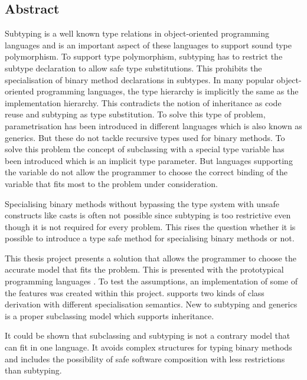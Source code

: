 %
%
\subsection*{Abstract}
Subtyping is a well known type relations in object-oriented
programming languages and is an important aspect of these languages
to support sound type polymorphism. To support type polymorphism,
subtyping has to restrict the subtype declaration to allow safe type
substitutions. This prohibits the specialisation of binary method declarations 
in subtypes. In many popular object-oriented programming languages, the type
hierarchy is implicitly the same as the implementation hierarchy. This
contradicts the notion of inheritance as code reuse and subtyping as type
substitution. To solve this type of problem, parametrisation has been introduced in
different languages which is also known as generics. But these do not
tackle recursive types used for binary methods. To solve this problem
the concept of subclassing with a special type variable \mytype has been
introduced which is an implicit type parameter. But languages supporting
the \mytype variable do not allow the programmer to choose the correct
binding of the variable that fits most to the problem under consideration.

Specialising binary methods without bypassing the type system with
unsafe constructs like casts is often not possible since subtyping is
too restrictive even though it is not required for every problem. This
rises the question whether it is possible to introduce a type safe method
for specialising binary methods or not.

This thesis project presents a solution that allows the programmer to
choose the accurate model that fits the problem. This is presented
with the prototypical programming languages \ooplss. To test the
assumptions, an implementation of some of the features was created
within this project. \ooplss supports two kinds of class derivation
with different specialisation semantics. New to subtyping and generics
is a proper subclassing model which supports inheritance.

It could be shown that subclassing and subtyping is not a contrary model
that can fit in one language. It avoids complex structures for typing
binary methods and includes the possibility of safe software composition
with less restrictions than subtyping.



%
